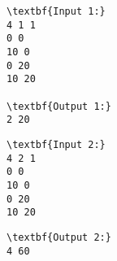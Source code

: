 \begin{verbatim}
\textbf{Input 1:}
4 1 1
0 0
10 0
0 20
10 20

\textbf{Output 1:}
2 20\end{verbatim}
\begin{verbatim}
\textbf{Input 2:}
4 2 1
0 0
10 0
0 20
10 20\end{verbatim}
\begin{verbatim}
\textbf{Output 2:}
4 60\end{verbatim}
